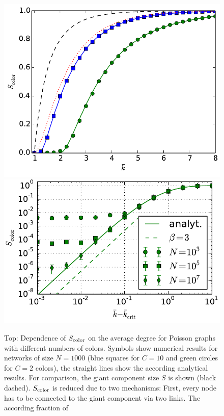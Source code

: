 \documentclass[aps, pre, twocolumn, a4paper, floatfix]{revtex4}
\begin{document}
{\begin{figure}[htb]
\begin{center}
    \includegraphics[width=1.0\columnwidth]{S_color_poisson.pdf}
    \includegraphics[width=1.0\columnwidth]{testtest.pdf}
    \caption{Top: Dependence of $S_{\rm color}$ on the average degree for Poisson graphs with different 
    numbers of colors. Symbols show numerical results for networks of size $N=1000$ 
    (blue squares for $C=10$ and green circles for $C=2$ colors), 
    the straight lines show the according analytical results. For comparison, 
    the giant component size $S$ is shown (black dashed). $S_{\rm color}$ is reduced due to two mechanisms: First, 
    every node has to be connected to the giant component via two links. The according fraction of 
}
\end{center}
\end{figure}}
\end{document}
